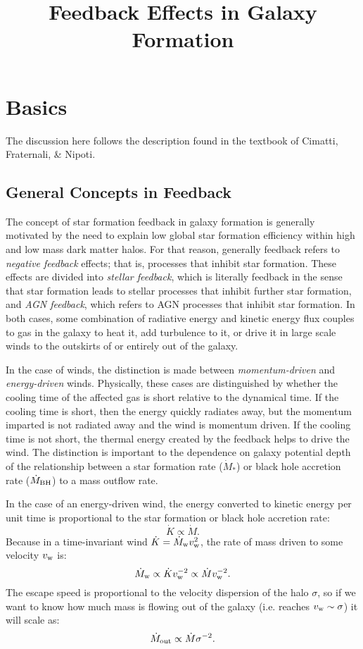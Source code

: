 \title{\bf Feedback Effects in Galaxy Formation}

\section{Basics}

The discussion here follows the description found in the textbook of
Cimatti, Fraternali, \& Nipoti.

\subsection{General Concepts in Feedback}

The concept of star formation feedback in galaxy formation is
generally motivated by the need to explain low global star formation
efficiency within high and low mass dark matter halos. For that
reason, generally feedback refers to {\it negative feedback} effects;
that is, processes that inhibit star formation. These effects are
divided into {\it stellar feedback}, which is literally feedback in
the sense that star formation leads to stellar processes that inhibit
further star formation, and {\it AGN feedback}, which refers to AGN
processes that inhibit star formation. In both cases, some combination
of radiative energy and kinetic energy flux couples to gas in the
galaxy to heat it, add turbulence to it, or drive it in large scale
winds to the outskirts of or entirely out of the galaxy.

In the case of winds, the distinction is made between {\it
  momentum-driven} and {\it energy-driven} winds. Physically, these
cases are distinguished by whether the cooling time of the affected
gas is short relative to the dynamical time. If the cooling time is
short, then the energy quickly radiates away, but the momentum
imparted is not radiated away and the wind is momentum driven. If the
cooling time is not short, the thermal energy created by the feedback
helps to drive the wind. The distinction is important to the
dependence on galaxy potential depth of the relationship between a
star formation rate ($\dot M_\ast$) or black hole accretion rate
($\dot M_{\rm BH}$) to a mass outflow rate.

In the case of an energy-driven wind, the energy converted to kinetic
energy per unit time is proportional to the star formation or
black hole accretion rate:
\begin{equation}
\dot K \propto \dot M.
\end{equation}
Because in a time-invariant wind $\dot K = \dot M_{\rm w} v_{\rm w}^2$,
the rate of mass driven to some velocity $v_{\rm w}$ is:
\begin{equation}
\dot M_{\rm w} \propto \dot K v_{\rm w}^{-2} \propto \dot M v_{\rm
  w}^{-2}.
\end{equation}
The escape speed is proportional to the velocity dispersion of the
halo $\sigma$, so if we want to know how much mass is flowing out of
the galaxy (i.e. reaches $v_{\rm w} \sim \sigma$) it will scale as:
\begin{equation}
\dot M_{\rm out} \propto \dot M \sigma^{-2}.
\end{equation}

